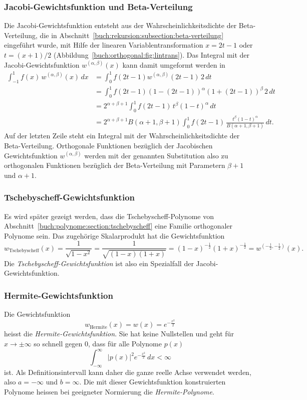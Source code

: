 \subsubsection{Jacobi-Gewichtsfunktion und Beta-Verteilung
\label{buch:orthogonal:subsection:beta-verteilung}}
Die Jacobi-Gewichtsfunktion entsteht aus der Wahrscheinlichkeitsdichte
der Beta-Verteilung, die in
Abschnitt~\ref{buch:rekursion:subsection:beta-verteilung}
eingeführt wurde, mit Hilfe der linearen Variablentransformation $x = 2t-1$
oder $t=(x+1)/2$ (Abbildung~\ref{buch:orthogonal:fig:lintrans}).
%
Das Integral mit der Jacobi-Gewichtsfunktion $w^{(\alpha,\beta)}(x)$
kann damit umgeformt werden in
\begin{align*}
\int_{-1}^1
f(x)\,w^{(\alpha,\beta)}(x)\,dx
&=
\int_0^1
f(2t-1) w^{(\alpha,\beta)}(2t-1)\,2\,dt
\\
&=
\int_0^1
f(2t-1)
(1-(2t-1))^\alpha (1+(2t-1))^\beta
\,2\,dt
\\
&=
2^{\alpha+\beta+1}
\int_0^1
f(2t-1)
\,
t^\beta
(1-t)^\alpha
\,dt
\\
&=
2^{\alpha+\beta+1}
B(\alpha+1,\beta+1)
\int_0^1
f(2t-1)
\,
\frac{
t^\beta
(1-t)^\alpha
}{B(\alpha+1,\beta+1)}
\,dt.
\end{align*}
Auf der letzten Zeile steht ein Integral mit der Wahrscheinlichkeitsdichte
der Beta-Verteilung.
Orthogonale Funktionen bezüglich der Jacobischen Gewichtsfunktion
$w^{(\alpha,\beta)}$ werden mit der genannten Substitution also
zu orthogonalen Funktionen bezüglich der Beta-Verteilung mit
Parametern $\beta+1$ und $\alpha+1$.


%
%
\subsubsection{Tschebyscheff-Gewichtsfunktion}
Es wird später gezeigt werden, dass die Tschebyscheff-Polynome
von Abschnitt~\ref{buch:polynome:section:tschebyscheff} eine
Familie orthogonaler Polynome sein.
Das zugehörige Skalarprodukt hat die Gewichtsfunktion
\[
w_{\text{Tschebyscheff}}(x)
=
\frac{1}{\sqrt{1-x^2}}
=
\frac{1}{\sqrt{(1-x)(1+x)}}
=
(1-x)^{-\frac{1}{2}}
(1+x)^{-\frac{1}{2}}
=
w^{(-\frac12,-\frac12)}(x).
\]
Die {\em Tschebyscheff-Gewichtsfunktion} ist also ein Spezialfall der
Jacobi-Gewichtsfunktion.
%

%
%
\subsubsection{Hermite-Gewichtsfunktion}
%
Die Gewichtsfunktion
\[
w_{\text{Hermite}}(x)
=
w(x)
=
e^{-\frac{x^2}{2}}
\]
heisst die {\em Hermite-Gewichtsfunktion}.
%
Sie hat keine Nullstellen und geht für $x\to\pm\infty$ so schnell
gegen $0$, dass für alle Polynome $p(x)$
\[
\int_{-\infty}^\infty |p(x)|^2 e^{-\frac{x^2}{2}}\,dx<\infty
\]
ist.
Als Definitionsintervall kann daher die ganze reelle Achse
verwendet werden, also $a=-\infty$ und $b=\infty$.
Die mit dieser Gewichtsfunktion konstruierten Polynome heissen
bei geeigneter Normierung die {\em Hermite-Polynome}.
%

